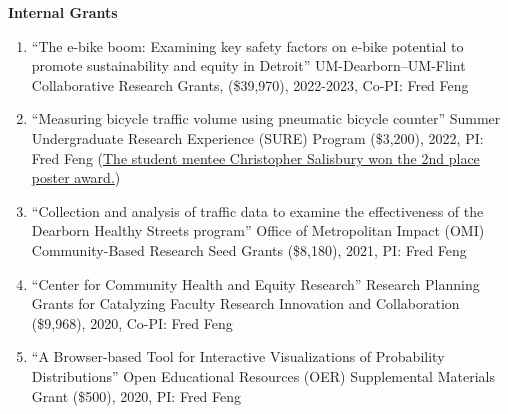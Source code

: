 \documentclass[11pt]{article}
\newenvironment{main}
{\begin{adjustwidth}{3em}{}}
{\end{adjustwidth}}
\begin{document}
\begin{main}
\textbf{Internal Grants}
\begin{enumerate}
    \item ``The e-bike boom: Examining key safety factors on e-bike potential to promote sustainability and equity in Detroit''
            UM-Dearborn–UM-Flint Collaborative Research Grants, (\$39,970), 2022-2023, Co-PI: Fred Feng
    \item ``Measuring bicycle traffic volume using pneumatic bicycle counter''
           Summer Undergraduate Research Experience (SURE) Program (\$3,200), 2022, PI: Fred Feng 
           (\href{https://umdearborn.edu/academics/undergraduate-studies/undergraduate-research/sure-program}{The student mentee Christopher Salisbury won the 2nd place poster award.})
    \item ``Collection and analysis of traffic data to examine the effectiveness of the Dearborn Healthy Streets program''
          Office of Metropolitan Impact (OMI) Community-Based Research Seed Grants (\$8,180), 2021, PI: Fred Feng
    \item ``Center for Community Health and Equity Research'' 
         Research Planning Grants for Catalyzing Faculty Research Innovation and Collaboration (\$9,968), 2020, Co-PI: Fred Feng
    \item ``A Browser-based Tool for Interactive Visualizations of Probability Distributions''
        Open Educational Resources (OER) Supplemental Materials Grant (\$500), 2020, PI: Fred Feng

\end{enumerate}





\end{main}
\end{document}
